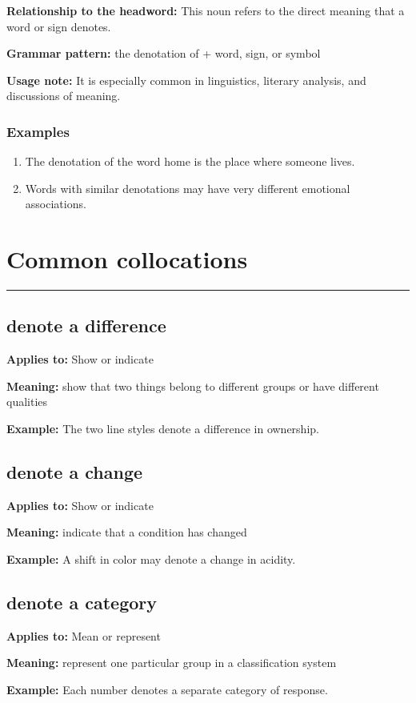 \documentclass[11pt]{article}
\newcommand{\sectionrule}{\par\vspace{-0.5em}\noindent\textcolor{Accent}{\rule{\linewidth}{0.6pt}}\par}
\begin{document}
\textbf{Relationship to the headword:} This noun refers to the direct meaning that a word or sign denotes.

\textbf{Grammar pattern:} the denotation of + word, sign, or symbol

\textbf{Usage note:} It is especially common in linguistics, literary analysis, and discussions of meaning.

\subsubsection{Examples}
\begin{enumerate}
  \item The denotation of the word home is the place where someone lives.
  \item Words with similar denotations may have very different emotional associations.
\end{enumerate}

\section{Common collocations}
\sectionrule
\subsection{denote a difference}
\textbf{Applies to:} Show or indicate

\textbf{Meaning:} show that two things belong to different groups or have different qualities

\textbf{Example:} The two line styles denote a difference in ownership.

\subsection{denote a change}
\textbf{Applies to:} Show or indicate

\textbf{Meaning:} indicate that a condition has changed

\textbf{Example:} A shift in color may denote a change in acidity.

\subsection{denote a category}
\textbf{Applies to:} Mean or represent

\textbf{Meaning:} represent one particular group in a classification system

\textbf{Example:} Each number denotes a separate category of response.
\end{document}

